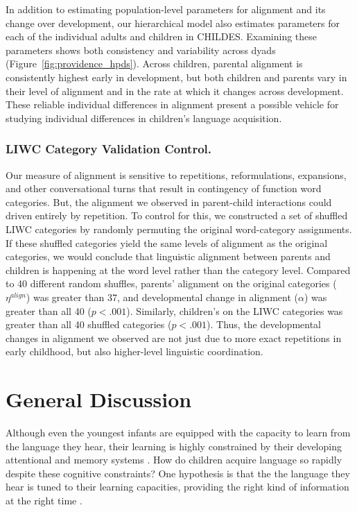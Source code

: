 \documentclass[10pt,letterpaper]{article}
\begin{document}
In addition to estimating population-level parameters for alignment and its change over development, our hierarchical model also estimates parameters for each of the individual adults and children in CHILDES. Examining these parameters shows both consistency and variability across dyads (Figure~\ref{fig:providence_hpds}). Across children, parental alignment is consistently highest early in development, but both children and parents vary in their level of alignment and in the rate at which it changes across development. These reliable individual differences in alignment present a possible vehicle for studying individual differences in children's language acquisition.
\vspace{6pt}

\subsubsection{LIWC Category Validation Control.}

Our measure of alignment is sensitive to repetitions, reformulations, expansions, and other conversational turns that result in contingency of function word categories. But, the alignment we observed in parent-child interactions could driven entirely by repetition. To control for this, we constructed a set of shuffled LIWC categories by randomly permuting the original word-category assignments. If these shuffled categories yield the same levels of alignment as the original categories, we would conclude that linguistic alignment between parents and children is happening at the word level rather than the category level. Compared to 40 different random shuffles, parents' alignment on the original categories ($\eta^{align}$) was greater than 37, and developmental change in alignment ($\alpha$) was greater than all 40 ($p < .001$). Similarly, children's on the LIWC categories was greater than all 40 shuffled categories ($p < .001$). Thus, the developmental changes in alignment we observed are not just due to more exact repetitions in early childhood, but also higher-level linguistic coordination.

\section{General Discussion}

Although even the youngest infants are equipped with the capacity to learn from the language they hear, their learning is highly constrained by their developing attentional and memory systems \cite{vlach2013}. How do children acquire language so rapidly despite these cognitive constraints? One hypothesis is that the the language they hear is tuned to their learning capacities, providing the right kind of information at the right time \cite{snow1972, vygotsky1978}.
\end{document}
